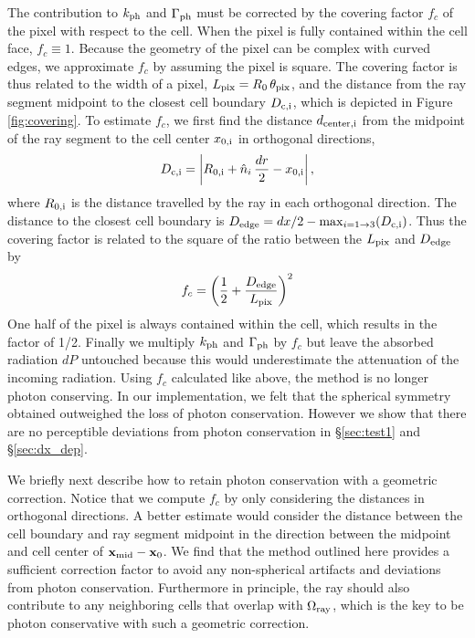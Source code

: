 \documentclass[useAMS,usenatbib,a4paper]{mn2e}
\begin{document}
The contribution to $k_{\rm ph}$ and $\Gamma_{\rm ph}$ must be
corrected by the covering factor $f_c$ of the pixel with respect to
the cell.  When the pixel is fully contained within the cell face,
$f_c \equiv 1$.  Because the geometry of the pixel can be complex with
curved edges, we approximate $f_c$ by assuming the pixel is square.
The covering factor is thus related to the width of a pixel, $L_{\rm
  pix} = R_0 \, \theta_{\rm pix}$, and the distance from the ray
segment midpoint to the closest cell boundary $D_{\rm c,i}$, which is
depicted in Figure \ref{fig:covering}.  To estimate $f_c$, we first
find the distance $d_{\rm center,i}$ from the midpoint of the ray
segment to the cell center $x_{\rm 0,i}$ in orthogonal directions,
%
\begin{equation}
  \label{eqn:midpoint}
  D_{\rm c,i} = \left| R_{\rm 0,i} + \hat{n}_i\,\frac{dr}{2} - x_{\rm
      0,i} \right|,
\end{equation}
where $R_{\rm 0,i}$ is the distance travelled by the ray in each
orthogonal direction.  The distance to the closest cell boundary is
$D_{\rm edge} = dx/2 - \max_{i=1 \rightarrow 3} (D_{\rm c,i})$.  Thus
the covering factor is related to the square of the ratio between the
$L_{\rm pix}$ and $D_{\rm edge}$ by
%
\begin{equation}
  \label{eqn:fc}
  f_c = \left( \frac{1}{2} + \frac{D_{\rm edge}}{L_{\rm pix}} \right)^2
\end{equation}
One half of the pixel is always contained within the cell, which
results in the factor of 1/2.  Finally we multiply $k_{\rm ph}$ and
$\Gamma_{\rm ph}$ by $f_c$ but leave the absorbed radiation $dP$
untouched because this would underestimate the attenuation of the
incoming radiation.  Using $f_c$ calculated like above, the method is
no longer photon conserving.  In our implementation, we felt that the
spherical symmetry obtained outweighed the loss of photon
conservation.  However we show that there are no perceptible
deviations from photon conservation in \S\ref{sec:test1} and
\S\ref{sec:dx_dep}.

We briefly next describe how to retain photon conservation with a
geometric correction.  Notice that we compute $f_c$ by only
considering the distances in orthogonal directions.  A better estimate
would consider the distance between the cell boundary and ray segment
midpoint in the direction between the midpoint and cell center of
$\mathbf{x}_{\rm mid} - \mathbf{x}_0$.  We find that the method
outlined here provides a sufficient correction factor to avoid any
non-spherical artifacts and deviations from photon conservation.
Furthermore in principle, the ray should also contribute to any
neighboring cells that overlap with $\Omega_{\rm ray}$, which is the
key to be photon conservative with such a geometric correction.
\end{document}
